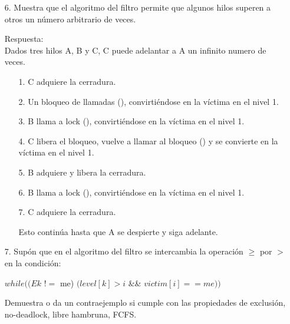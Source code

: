 \documentclass[12pt, letterpaper]{article}
\begin{document}
\begin{itemize}
\begin{itemize}
\end{itemize}


\item[6. ]Muestra que el algoritmo del filtro permite que algunos hilos superen a otros
un número arbitrario de veces.

Respuesta: \\
Dados tres hilos A, B y C, C puede adelantar a A un infinito numero de veces.
\begin{itemize}


\item[1. ] C adquiere la cerradura.
\item[2. ] Un bloqueo de llamadas (), convirtiéndose en la víctima en el nivel 1.
\item[3. ] B llama a lock (), convirtiéndose en la víctima en el nivel 1.
\item[4. ] C libera el bloqueo, vuelve a llamar al bloqueo () y se convierte en la víctima en el nivel 1.
\item[5. ] B adquiere y libera la cerradura.
\item[6. ] B llama a lock (), convirtiéndose en la víctima en el nivel 1.
\item[7. ] C adquiere la cerradura.

Esto contin\'ua hasta que A se despierte y siga adelante.

\end{itemize}

\item[7. ]Sup\'on que en el algoritmo del filtro se intercambia la operaci\'on $ \geqslant$ por $>$ en la condici\'on:

\begin{center}
 $while((Ek$ $!=$ me) $(level[k] > i$ \&\& $victim[i] == me))$
\end{center}
Demuestra o da un contraejemplo si cumple con las propiedades de exclusión, no-deadlock, libre hambruna, FCFS.


\end{itemize}
\end{document}
